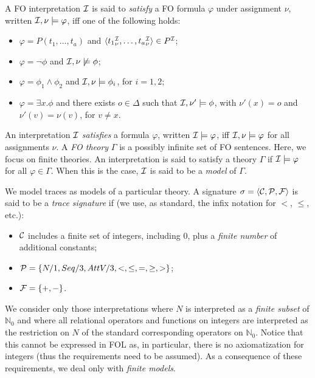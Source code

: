 A FO interpretation
$\mathcal{I}$ is said to \emph{satisfy}
a FO formula $\varphi$ under assignment $\nu$,
written $\mathcal{I}, \nu\models\varphi$, iff one of the following holds:
\begin{itemize}
	\item $\varphi=P(t_1,\ldots,t_a)$ and
	$\langle {t_1}^{\mathcal{I}}_\nu,\ldots,{t_a}^{\mathcal{I}}_\nu\rangle\in P^{\mathcal{I}}$;
	\item $\varphi=\lnot \phi$ and $\mathcal{I},\nu\not\models\phi$;
	\item $\varphi=\phi_1\land \phi_2$ and $\mathcal{I},\nu\models \phi_i$, for $i=1,2$;
	\item $\varphi=\exists x.\phi$ and there exists $o\in\Delta$ such that
$\mathcal{I},\nu'\models \phi$, with $\nu'(x)=o$ and $\nu'(v)=\nu(v)$, for $v\neq x$.
\end{itemize}
An interpretation $\mathcal{I}$ \emph{satisfies}
a formula $\varphi$, written $\mathcal{I}\models \varphi$, iff $\mathcal{I},\nu\models\varphi$
for all assignments $\nu$.
A \emph{FO theory} $\Gamma$ is a possibly infinite set of FO sentences. Here,
we focus on finite theories.
An interpretation is said to
satisfy a theory $\Gamma$ if $\mathcal{I}\models\varphi$ for all $\varphi\in\Gamma$.
When
this is the case, $\mathcal{I}$ is said to be a \emph{model} of $\Gamma$.


We model traces as models of a particular theory.
A signature
$\sigma=\langle \mathcal{C},\mathcal{P},\mathcal{F}\rangle$ is said to be a \emph{trace signature} if (we use, as
standard, the infix notation for $<$, $\leq$, etc.):
\begin{itemize}
	\item	
		$\mathcal{C}$ includes a finite set of integers, including 0,
		plus a \emph{finite number}
		of additional constants;		
	\item $\mathcal{P}=\{N/1,Seq/3,AttV/3,<,\leq,=,\geq,>\}$;		
	\item $\mathcal{F}=\{+,-\}$.
	
\end{itemize}
We consider only those interpretations where $N$ is interpreted as a
\emph{finite subset} of $\mathbb{N}_0$ and where all relational operators
and functions on integers are interpreted as the restriction on $N$ of
the standard corresponding operators on $\mathbb{N}_0$. Notice that this cannot
be expressed in FOL as, in particular, there is no axiomatization for
integers (thus the requirements need to be assumed). As a consequence of these
requirements, we deal only with \emph{finite models}.


